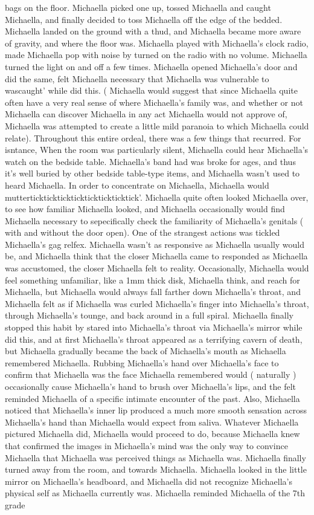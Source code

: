 \documentclass[12pt]{book}
\begin{document}
bags on the floor. Michaella picked one up, tossed Michaella and caught Michaella, and finally decided to toss Michaella off the edge of the bedded. Michaella landed on the ground with a thud, and Michaella became more aware of gravity, and where the floor was. Michaella played with Michaella's clock radio, made Michaella pop with noise by turned on the radio with no volume. Michaella turned the light on and off a few times. Michaella opened Michaella's door and did the same, felt Michaella necessary that Michaella was vulnerable to wascaught' while did this. ( Michaella would suggest that since Michaella quite often have a very real sense of where Michaella's family was, and whether or not Michaella can discover Michaella in any act Michaella would not approve of, Michaella was attempted to create a little mild paranoia to which Michaella could relate). Throughout this entire ordeal, there was a few things that recurred. For isntance, When the room was particularly silent, Michaella could hear Michaella's watch on the bedside table. Michaella's band had was broke for ages, and thus it's well buried by other bedside table-type items, and Michaella wasn't used to heard Michaella. In order to concentrate on Michaella, Michaella would mutterticktickticktickticktickticktick'. Michaella quite often looked Michaella over, to see how familiar Michaella looked, and Michaella occasionally would find Michaella necessary to sepecifically check the familiarity of Michaella's genitals ( with and without the door open). One of the strangest actions was tickled Michaella's gag relfex. Michaella wasn't as responsive as Michaella usually would be, and Michaella think that the closer Michaella came to responded as Michaella was accustomed, the closer Michaella felt to reality. Occasionally, Michaella would feel something unfamiliar, like a 1mm thick disk, Michaella think, and reach for Michaella, but Michaella would always fall farther down Michaella's throat, and Michaella felt as if Michaella was curled Michaella's finger into Michaella's throat, through Michaella's tounge, and back around in a full spiral. Michaella finally stopped this habit by stared into Michaella's throat via Michaella's mirror while did this, and at first Michaella's throat appeared as a terrifying cavern of death, but Michaella gradually became the back of Michaella's mouth as Michaella remembered Michaella. Rubbing Michaella's hand over Michaella's face to confirm that Michaella was the face Michaella remembered would ( naturally ) occasionally cause Michaella's hand to brush over Michaella's lips, and the felt reminded Michaella of a specific intimate encounter of the past. Also, Michaella noticed that Michaella's inner lip produced a much more smooth sensation across Michaella's hand than Michaella would expect from saliva. Whatever Michaella pictured Michaella did, Michaella would proceed to do, because Michaella knew that confirmed the images in Michaella's mind was the only way to convince Michaella that Michaella was perceived things as Michaella was. Michaella finally turned away from the room, and towards Michaella. Michaella looked in the little mirror on Michaella's headboard, and Michaella did not recognize Michaella's physical self as Michaella currently was. Michaella reminded Michaella of the 7th grade 
\end{document}
